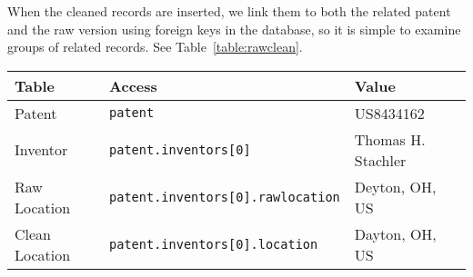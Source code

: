 When the cleaned records are inserted, we link them to both the related
patent and the raw version using foreign keys in the database, so
it is simple to examine groups of related records. See Table~\ref{table:rawclean}.

\begin{table*}
\center %
\begin{tabular}{|l|l|l|}
\hline 
Table  & Access  & Value \tabularnewline
\hline 
Patent  & \verb`patent`  & US8434162 \tabularnewline
Inventor  & \verb`patent.inventors[0]`  & Thomas H. Stachler \tabularnewline
Raw Location  & \verb`patent.inventors[0].rawlocation`  & Deyton, OH, US \tabularnewline
Clean Location  & \verb`patent.inventors[0].location`  & Dayton, OH, US \tabularnewline
\hline 
\end{tabular}\caption{Accessing related raw and clean records. Note the spelling correction
in the clean record}


\label{table:rawclean} 
\end{table*}

